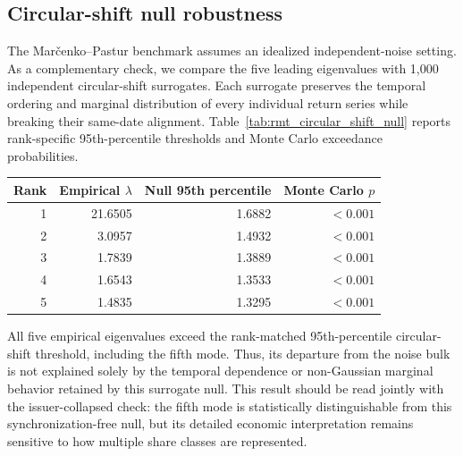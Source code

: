 \subsection{Circular-shift null robustness}

The Mar\v{c}enko--Pastur benchmark assumes an idealized independent-noise setting. As a complementary check, we compare the five leading eigenvalues with 1,000 independent circular-shift surrogates. Each surrogate preserves the temporal ordering and marginal distribution of every individual return series while breaking their same-date alignment. Table~\ref{tab:rmt_circular_shift_null} reports rank-specific 95th-percentile thresholds and Monte Carlo exceedance probabilities.

\begin{center}
\label{tab:rmt_circular_shift_null}
\begin{tabular}{rrrr}
\toprule
Rank & Empirical $\lambda$ & Null 95th percentile & Monte Carlo $p$ \\
\midrule
1 & 21.6505 & 1.6882 & $<0.001$ \\
2 & 3.0957 & 1.4932 & $<0.001$ \\
3 & 1.7839 & 1.3889 & $<0.001$ \\
4 & 1.6543 & 1.3533 & $<0.001$ \\
5 & 1.4835 & 1.3295 & $<0.001$ \\
\bottomrule
\end{tabular}
\end{center}

All five empirical eigenvalues exceed the rank-matched 95th-percentile circular-shift threshold, including the fifth mode. Thus, its departure from the noise bulk is not explained solely by the temporal dependence or non-Gaussian marginal behavior retained by this surrogate null. This result should be read jointly with the issuer-collapsed check: the fifth mode is statistically distinguishable from this synchronization-free null, but its detailed economic interpretation remains sensitive to how multiple share classes are represented.
